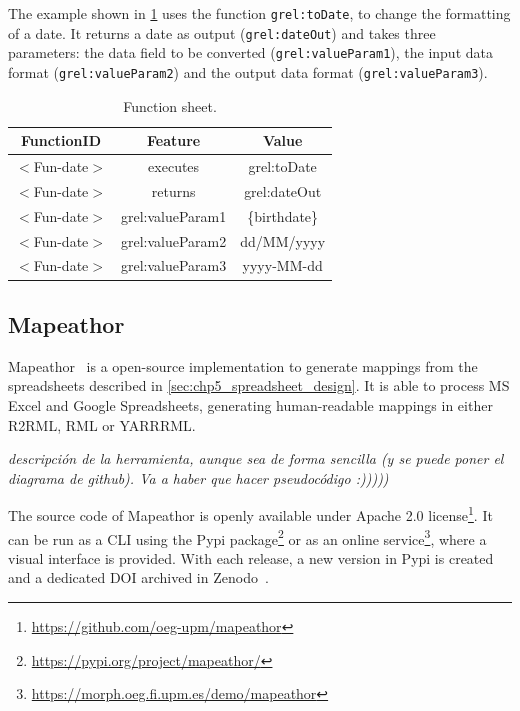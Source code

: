 The example shown in \cref{tab:function_sheet} uses the function \texttt{grel:toDate}, to change the formatting of a date. It returns a date as output (\texttt{grel:dateOut}) and takes three parameters: the data field to be converted (\texttt{grel:valueParam1}), the input data format (\texttt{grel:valueParam2}) and the output data format (\texttt{grel:valueParam3}).

\begin{table}[h!]
\caption{Function sheet.}
\label{tab:function_sheet}
\centering
\begin{tabular}{c|c|c}
\midrule
\textbf{FunctionID} & \textbf{Feature} & \textbf{Value} \\ \midrule
$<$Fun-date$>$ & executes & grel:toDate \\  
$<$Fun-date$>$ & returns & grel:dateOut \\  
$<$Fun-date$>$ & grel:valueParam1 & \{birthdate\} \\
$<$Fun-date$>$ & grel:valueParam2 & dd/MM/yyyy \\
$<$Fun-date$>$ & grel:valueParam3 & yyyy-MM-dd \\
\midrule
\end{tabular}
\end{table}


\subsection{Mapeathor}
\label{sec:chp5_mapeathor_tool}

Mapeathor~\citep{iglesias-molina_2023_5973906} is a open-source implementation to generate mappings from the spreadsheets described in \cref{sec:chp5_spreadsheet_design}. It is able to process MS Excel and Google Spreadsheets, generating human-readable mappings in either R2RML, RML or YARRRML. 

\textit{descripción de la herramienta, aunque sea de forma sencilla (y se puede poner el diagrama de github). Va a haber que hacer pseudocódigo :)))))}

The source code of Mapeathor is openly available under Apache 2.0 license\footnote{\url{https://github.com/oeg-upm/mapeathor}}. It can be run as a CLI using the Pypi package\footnote{\url{https://pypi.org/project/mapeathor/}} or as an online service\footnote{\url{https://morph.oeg.fi.upm.es/demo/mapeathor}}, where a visual interface is provided. With each release, a new version in Pypi is created and a dedicated DOI archived in Zenodo~\citep{iglesias-molina_2023_5973906}. 

